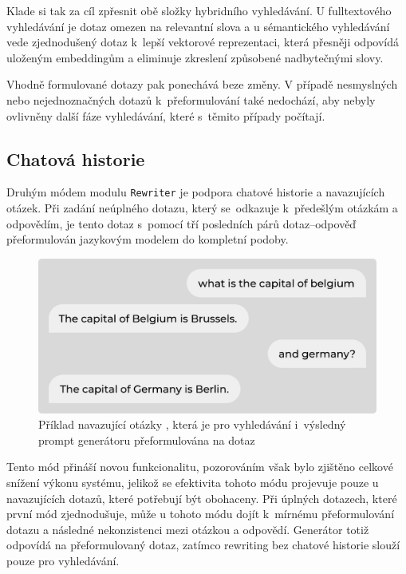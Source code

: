 Klade si tak za cíl zpřesnit obě složky hybridního vyhledávání. U fulltextového vyhledávání je dotaz omezen na relevantní slova a u sémantického vyhledávání vede zjednodušený dotaz k~lepší vektorové reprezentaci, která přesněji odpovídá uloženým embeddingům a eliminuje zkreslení způsobené nadbytečnými slovy.

Vhodně formulované dotazy pak ponechává beze změny. V případě nesmyslných nebo nejednoznačných dotazů k~přeformulování také nedochází, aby nebyly ovlivněny další fáze vyhledávání, které s~těmito případy počítají.

\subsection{Chatová historie}
Druhým módem modulu \texttt{Rewriter} je podpora chatové historie a navazujících otázek. Při zadání neúplného dotazu, který se~odkazuje k~předešlým otázkám a odpovědím, je tento dotaz s~pomocí tří posledních párů dotaz–odpověď přeformulován jazykovým modelem do kompletní podoby.

\begin{figure}[H]
    \centering
    \includegraphics[width=0.7\linewidth]{obrazky/chathistory.pdf}
    \caption{Příklad navazující otázky , která je pro vyhledávání i~výsledný prompt generátoru přeformulována na dotaz }
    \label{fig:rewriting}
\end{figure}

Tento mód přináší novou funkcionalitu, pozorováním však bylo zjištěno celkové snížení výkonu systému, jelikož se efektivita tohoto módu projevuje pouze u navazujících dotazů, které potřebují být obohaceny. Při úplných dotazech, které první mód zjednodušuje, může u tohoto módu dojít k~mírnému přeformulování dotazu a následné nekonzistenci mezi otázkou a odpovědí. Generátor totiž odpovídá na přeformulovaný dotaz, zatímco rewriting bez chatové historie slouží pouze pro vyhledávání.

